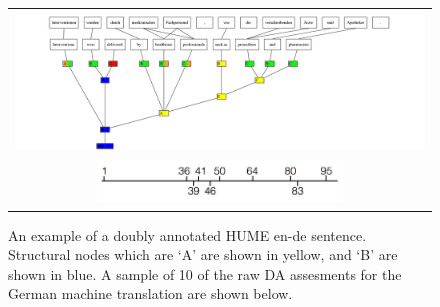 \documentclass[11pt,letterpaper]{article}
\begin{document}
\begin{figure}[t]
\begin{tabular}{c}
\includegraphics[width=1\textwidth]{tree_653_de1_de2.png}\\
\includegraphics[width=0.6\textwidth]{DAline-extract.png}
\end{tabular}
\caption{An example of a doubly annotated HUME en-de sentence. Structural nodes which are `A' are shown in yellow, and `B' are shown in blue. A sample of 10 of the raw DA assesments for the German machine translation are shown below.}
\label{fig:humeeg}
\end{figure}
%



\end{document}

